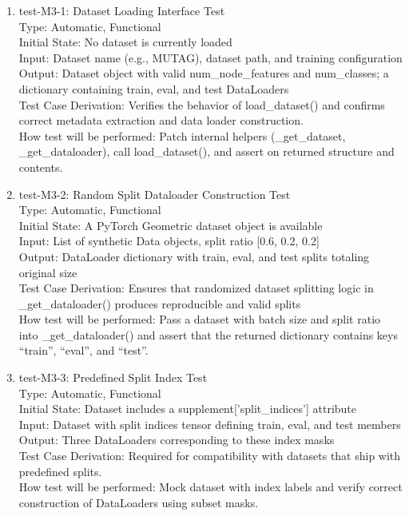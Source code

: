 \documentclass[12pt, titlepage]{article}
\begin{document}
\begin{enumerate}

\item{test-M3-1: Dataset Loading Interface Test\\}
Type: Automatic, Functional \\
Initial State: No dataset is currently loaded \\
Input: Dataset name (e.g., MUTAG), dataset path, and training configuration \\
Output: Dataset object with valid num\_node\_features and num\_classes; a dictionary containing train, eval, and test DataLoaders \\
Test Case Derivation: Verifies the behavior of load\_dataset() and confirms correct metadata extraction and data loader construction. \\
How test will be performed: Patch internal helpers (\_get\_dataset, \_get\_dataloader), call load\_dataset(), and assert on returned structure and contents.

\item{test-M3-2: Random Split Dataloader Construction Test\\}
Type: Automatic, Functional \\
Initial State: A PyTorch Geometric dataset object is available \\
Input: List of synthetic Data objects, split ratio [0.6, 0.2, 0.2] \\
Output: DataLoader dictionary with train, eval, and test splits totaling original size \\
Test Case Derivation: Ensures that randomized dataset splitting logic in \_get\_dataloader() produces reproducible and valid splits \\
How test will be performed: Pass a dataset with batch size and split ratio into \_get\_dataloader() and  assert that the returned dictionary contains keys ``train'', ``eval'', and ``test''. 


\item{test-M3-3: Predefined Split Index Test\\}
Type: Automatic, Functional \\
Initial State: Dataset includes a supplement['split\_indices'] attribute \\
Input: Dataset with split indices tensor defining train, eval, and test members \\
Output: Three DataLoaders corresponding to these index masks \\
Test Case Derivation: Required for compatibility with datasets that ship with predefined splits. \\
How test will be performed: Mock dataset with index labels and verify correct construction of DataLoaders using subset masks.


\end{enumerate}
\end{document}
